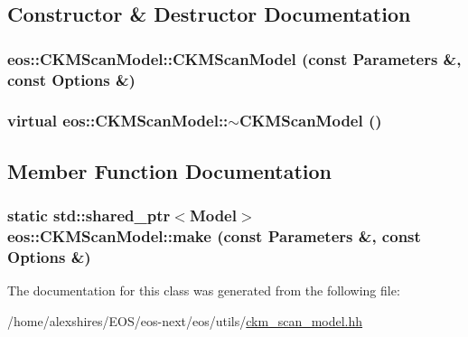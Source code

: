 \subsection{Constructor \& Destructor Documentation}
\hypertarget{classeos_1_1CKMScanModel_a348fbaeb80dc246db6d94fc704b34ddc}{
\subsubsection[{CKMScanModel}]{\setlength{\rightskip}{0pt plus 5cm}eos::CKMScanModel::CKMScanModel (const {\bf Parameters} \&, \/  const {\bf Options} \&)}}
\label{classeos_1_1CKMScanModel_a348fbaeb80dc246db6d94fc704b34ddc}
\hypertarget{classeos_1_1CKMScanModel_a33220021fdd61915cdbe327481f01122}{
\subsubsection[{$\sim$CKMScanModel}]{\setlength{\rightskip}{0pt plus 5cm}virtual eos::CKMScanModel::$\sim$CKMScanModel ()}}
\label{classeos_1_1CKMScanModel_a33220021fdd61915cdbe327481f01122}


\subsection{Member Function Documentation}
\hypertarget{classeos_1_1CKMScanModel_a78a49c4da540e56430d800173d129cc3}{
\subsubsection[{make}]{\setlength{\rightskip}{0pt plus 5cm}static std::shared\_\-ptr$<${\bf Model}$>$ eos::CKMScanModel::make (const {\bf Parameters} \&, \/  const {\bf Options} \&)}}
\label{classeos_1_1CKMScanModel_a78a49c4da540e56430d800173d129cc3}


The documentation for this class was generated from the following file:\begin{DoxyCompactItemize}
\item 
/home/alexshires/EOS/eos-\/next/eos/utils/\hyperlink{ckm__scan__model_8hh}{ckm\_\-scan\_\-model.hh}\end{DoxyCompactItemize}
